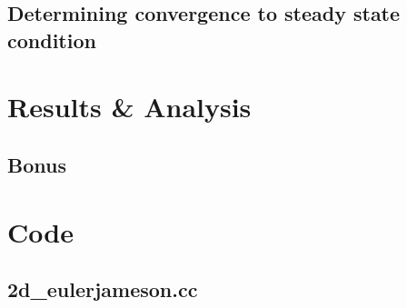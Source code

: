 \documentclass[11pt]{article}
\begin{document}
	
	\subsection{Determining convergence to steady state condition}

\section{Results \& Analysis}	
		
	
\subsection{Bonus}

	
	

\pagebreak
\appendix
\section{Code}
	\subsection{2d\_euler\-jameson.cc}
%		
		
	
\end{document}
